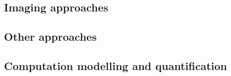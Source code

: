 \subsection{Imaging approaches}

\subsection{Other approaches}

\subsection{Computation modelling and quantification}





